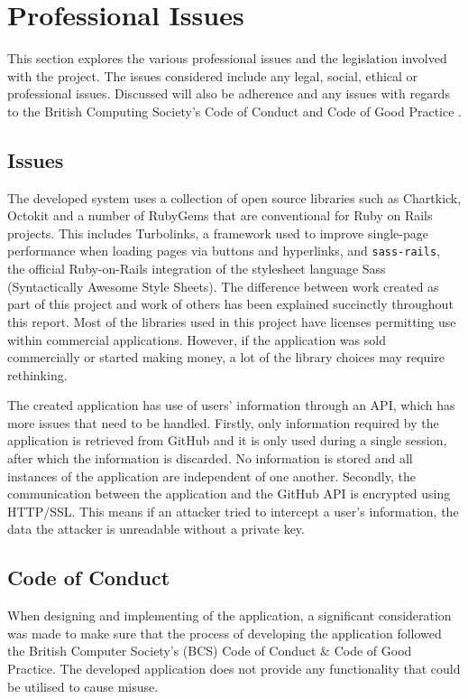 \chapter{Professional Issues}
This section explores the various professional issues and the legislation involved with the project. The issues considered include any legal, social, ethical or professional issues. Discussed will also be adherence and any issues with regards to the British Computing Society's Code of Conduct and Code of Good Practice \citep{bcsconduct}.

\section{Issues}
The developed system uses a collection of open source libraries such as Chartkick, Octokit and a number of RubyGems that are conventional for Ruby on Rails projects. This includes Turbolinks, a framework used to improve single-page performance when loading pages via buttons and hyperlinks, and \texttt{sass-rails}, the official Ruby-on-Rails integration of the stylesheet language Sass (Syntactically Awesome Style Sheets). The difference between work created as part of this project and work of others has been explained succinctly throughout this report. Most of the libraries used in this project have licenses permitting use within commercial applications. However, if the application was sold commercially or started making money, a lot of the library choices may require rethinking.

The created application has use of users' information through an API, which has more issues that need to be handled. Firstly, only information required by the application is retrieved from GitHub and it is only used during a single session, after which the information is discarded. No information is stored and all instances of the application are independent of one another. Secondly, the communication between the application and the GitHub API is encrypted using HTTP/SSL. This means if an attacker tried to intercept a user's information, the data the attacker is unreadable without a private key.  

\section{Code of Conduct}
When designing and implementing of the application, a significant consideration was made to make sure that the process of developing the application followed the British Computer Society's (BCS) Code of Conduct \& Code of Good Practice. The developed application does not provide any functionality that could be utilised to cause misuse. 